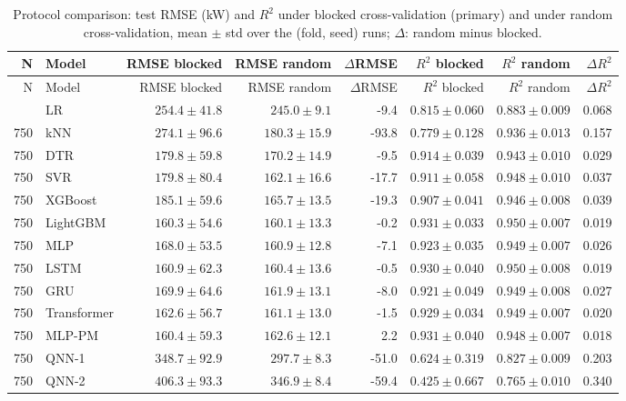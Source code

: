 \begin{longtable}{rlrrrrrr}
\caption{Protocol comparison: test RMSE (kW) and $R^2$ under blocked cross-validation (primary) and under random cross-validation, mean $\pm$ std over the (fold, seed) runs; $\Delta$: random minus blocked.}\label{tab:t9} \\
\toprule
N & Model & RMSE blocked & RMSE random & $\Delta$RMSE & $R^2$ blocked & $R^2$ random & $\Delta R^2$ \\
\midrule
\endfirsthead
\toprule
N & Model & RMSE blocked & RMSE random & $\Delta$RMSE & $R^2$ blocked & $R^2$ random & $\Delta R^2$ \\
\midrule
\endhead
\bottomrule
\endlastfoot
750 & LR & $254.4 \pm 41.8$ & $245.0 \pm 9.1$ & -9.4 & $0.815 \pm 0.060$ & $0.883 \pm 0.009$ & 0.068 \\
750 & kNN & $274.1 \pm 96.6$ & $180.3 \pm 15.9$ & -93.8 & $0.779 \pm 0.128$ & $0.936 \pm 0.013$ & 0.157 \\
750 & DTR & $179.8 \pm 59.8$ & $170.2 \pm 14.9$ & -9.5 & $0.914 \pm 0.039$ & $0.943 \pm 0.010$ & 0.029 \\
750 & SVR & $179.8 \pm 80.4$ & $162.1 \pm 16.6$ & -17.7 & $0.911 \pm 0.058$ & $0.948 \pm 0.010$ & 0.037 \\
750 & XGBoost & $185.1 \pm 59.6$ & $165.7 \pm 13.5$ & -19.3 & $0.907 \pm 0.041$ & $0.946 \pm 0.008$ & 0.039 \\
750 & LightGBM & $160.3 \pm 54.6$ & $160.1 \pm 13.3$ & -0.2 & $0.931 \pm 0.033$ & $0.950 \pm 0.007$ & 0.019 \\
750 & MLP & $168.0 \pm 53.5$ & $160.9 \pm 12.8$ & -7.1 & $0.923 \pm 0.035$ & $0.949 \pm 0.007$ & 0.026 \\
750 & LSTM & $160.9 \pm 62.3$ & $160.4 \pm 13.6$ & -0.5 & $0.930 \pm 0.040$ & $0.950 \pm 0.008$ & 0.019 \\
750 & GRU & $169.9 \pm 64.6$ & $161.9 \pm 13.1$ & -8.0 & $0.921 \pm 0.049$ & $0.949 \pm 0.008$ & 0.027 \\
750 & Transformer & $162.6 \pm 56.7$ & $161.1 \pm 13.0$ & -1.5 & $0.929 \pm 0.034$ & $0.949 \pm 0.007$ & 0.020 \\
750 & MLP-PM & $160.4 \pm 59.3$ & $162.6 \pm 12.1$ & 2.2 & $0.931 \pm 0.040$ & $0.948 \pm 0.007$ & 0.018 \\
750 & QNN-1 & $348.7 \pm 92.9$ & $297.7 \pm 8.3$ & -51.0 & $0.624 \pm 0.319$ & $0.827 \pm 0.009$ & 0.203 \\
750 & QNN-2 & $406.3 \pm 93.3$ & $346.9 \pm 8.4$ & -59.4 & $0.425 \pm 0.667$ & $0.765 \pm 0.010$ & 0.340 \\

\end{longtable}
